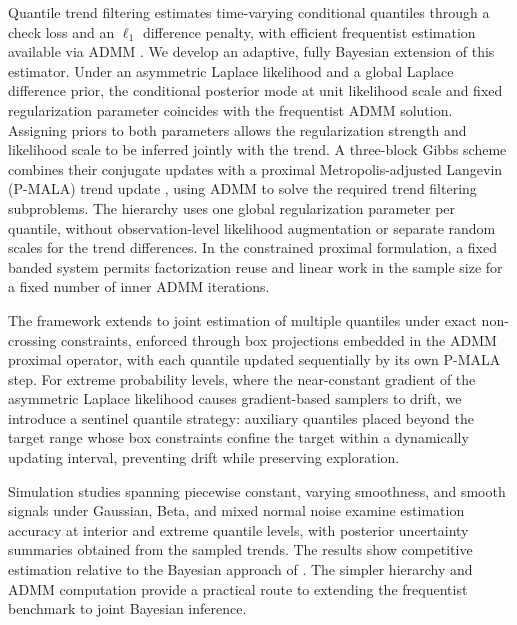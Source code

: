 Quantile trend filtering estimates time-varying conditional quantiles through a check loss and an $\ell_1$ difference penalty, with efficient frequentist estimation available via ADMM \citep{brantley2020baseline}. We develop an adaptive, fully Bayesian extension of this estimator. Under an asymmetric Laplace likelihood and a global Laplace difference prior, the conditional posterior mode at unit likelihood scale and fixed regularization parameter coincides with the frequentist ADMM solution. Assigning priors to both parameters allows the regularization strength and likelihood scale to be inferred jointly with the trend. A three-block Gibbs scheme combines their conjugate updates with a proximal Metropolis-adjusted Langevin (P-MALA) trend update \citep{pereyra2016proximal}, using ADMM to solve the required trend filtering subproblems. The hierarchy uses one global regularization parameter per quantile, without observation-level likelihood augmentation or separate random scales for the trend differences. In the constrained proximal formulation, a fixed banded system permits factorization reuse and linear work in the sample size for a fixed number of inner ADMM iterations.

The framework extends to joint estimation of multiple quantiles under exact non-crossing constraints, enforced through box projections embedded in the ADMM proximal operator, with each quantile updated sequentially by its own P-MALA step. For extreme probability levels, where the near-constant gradient of the asymmetric Laplace likelihood causes gradient-based samplers to drift, we introduce a sentinel quantile strategy: auxiliary quantiles placed beyond the target range whose box constraints confine the target within a dynamically updating interval, preventing drift while preserving exploration.

Simulation studies spanning piecewise constant, varying smoothness, and smooth signals under Gaussian, Beta, and mixed normal noise examine estimation accuracy at interior and extreme quantile levels, with posterior uncertainty summaries obtained from the sampled trends. The results show competitive estimation relative to the Bayesian approach of \citet{onizuka2024fast}. The simpler hierarchy and ADMM computation provide a practical route to extending the frequentist benchmark to joint Bayesian inference.
